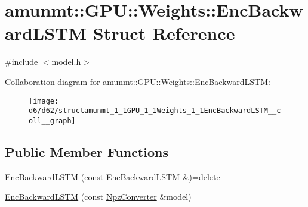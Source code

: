 \hypertarget{structamunmt_1_1GPU_1_1Weights_1_1EncBackwardLSTM}{}\section{amunmt\+:\+:G\+PU\+:\+:Weights\+:\+:Enc\+Backward\+L\+S\+TM Struct Reference}
\label{structamunmt_1_1GPU_1_1Weights_1_1EncBackwardLSTM}


{\ttfamily \#include $<$model.\+h$>$}



Collaboration diagram for amunmt\+:\+:G\+PU\+:\+:Weights\+:\+:Enc\+Backward\+L\+S\+TM\+:
\nopagebreak
\begin{figure}[H]
\begin{center}
\leavevmode
\texttt{[image: d6/d62/structamunmt\_1\_1GPU\_1\_1Weights\_1\_1EncBackwardLSTM\_\_coll\_\_graph]}
\end{center}
\end{figure}
\subsection*{Public Member Functions}
\begin{DoxyCompactItemize}
\item 
\hyperlink{structamunmt_1_1GPU_1_1Weights_1_1EncBackwardLSTM_a2864bd065791e2f59025c0c812712877}{Enc\+Backward\+L\+S\+TM} (const \hyperlink{structamunmt_1_1GPU_1_1Weights_1_1EncBackwardLSTM}{Enc\+Backward\+L\+S\+TM} \&)=delete
\item 
\hyperlink{structamunmt_1_1GPU_1_1Weights_1_1EncBackwardLSTM_a057a3a826cdca96f3841192e063d9d80}{Enc\+Backward\+L\+S\+TM} (const \hyperlink{classamunmt_1_1GPU_1_1NpzConverter}{Npz\+Converter} \&model)
\end{DoxyCompactItemize}
